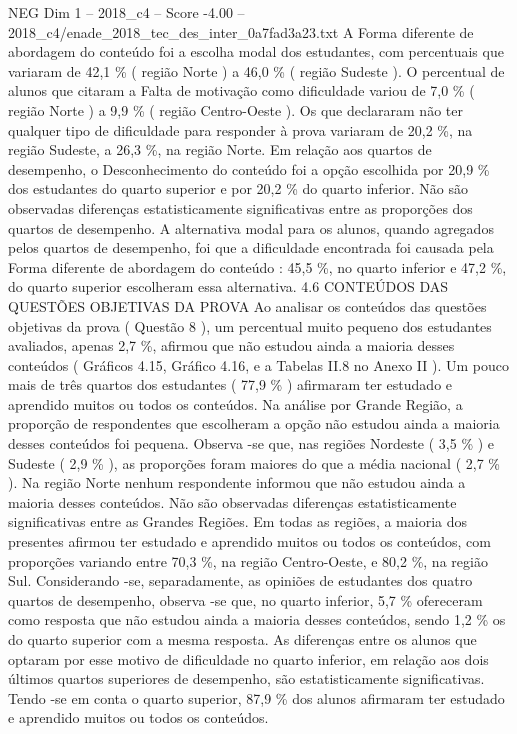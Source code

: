 \begin{textsample}{NEG Dim 1 – 2018\_c4 – Score -4.00 – 2018\_c4/enade\_2018\_tec\_des\_inter\_0a7fad3a23.txt}
A Forma diferente de abordagem do conteúdo foi a escolha modal dos estudantes, com percentuais que variaram de 42,1 \% ( região Norte ) a 46,0 \% ( região Sudeste ).
O percentual de alunos que citaram a Falta de motivação como dificuldade variou de 7,0 \% ( região Norte ) a 9,9 \% ( região Centro-Oeste ).
Os que declararam não ter qualquer tipo de dificuldade para responder à prova variaram de 20,2 \%, na região Sudeste, a 26,3 \%, na região Norte.
Em relação aos quartos de desempenho, o Desconhecimento do conteúdo foi a opção escolhida por 20,9 \% dos estudantes do quarto superior e por 20,2 \% do quarto inferior.
Não são observadas diferenças estatisticamente significativas entre as proporções dos quartos de desempenho.
A alternativa modal para os alunos, quando agregados pelos quartos de desempenho, foi que a dificuldade encontrada foi causada pela Forma diferente de abordagem do conteúdo : 45,5 \%, no quarto inferior e 47,2 \%, do quarto superior escolheram essa alternativa. 4.6 CONTEÚDOS DAS QUESTÕES OBJETIVAS DA PROVA Ao analisar os conteúdos das questões objetivas da prova ( Questão 8 ), um percentual muito pequeno dos estudantes avaliados, apenas 2,7 \%, afirmou que não estudou ainda a maioria desses conteúdos ( Gráficos 4.15, Gráfico 4.16, e a Tabelas II.8 no Anexo II ).
Um pouco mais de três quartos dos estudantes ( 77,9 \% ) afirmaram ter estudado e aprendido muitos ou todos os conteúdos.
Na análise por Grande Região, a proporção de respondentes que escolheram a opção não estudou ainda a maioria desses conteúdos foi pequena.
Observa -se que, nas regiões Nordeste ( 3,5 \% ) e Sudeste ( 2,9 \% ), as proporções foram maiores do que a média nacional ( 2,7 \% ).
Na região Norte nenhum respondente informou que não estudou ainda a maioria desses conteúdos.
Não são observadas diferenças estatisticamente significativas entre as Grandes Regiões.
Em todas as regiões, a maioria dos presentes afirmou ter estudado e aprendido muitos ou todos os conteúdos, com proporções variando entre 70,3 \%, na região Centro-Oeste, e 80,2 \%, na região Sul.
Considerando -se, separadamente, as opiniões de estudantes dos quatro quartos de desempenho, observa -se que, no quarto inferior, 5,7 \% ofereceram como resposta que não estudou ainda a maioria desses conteúdos, sendo 1,2 \% os do quarto superior com a mesma resposta.
As diferenças entre os alunos que optaram por esse motivo de dificuldade no quarto inferior, em relação aos dois últimos quartos superiores de desempenho, são estatisticamente significativas.
Tendo -se em conta o quarto superior, 87,9 \% dos alunos afirmaram ter estudado e aprendido muitos ou todos os conteúdos.

\end{textsample}
